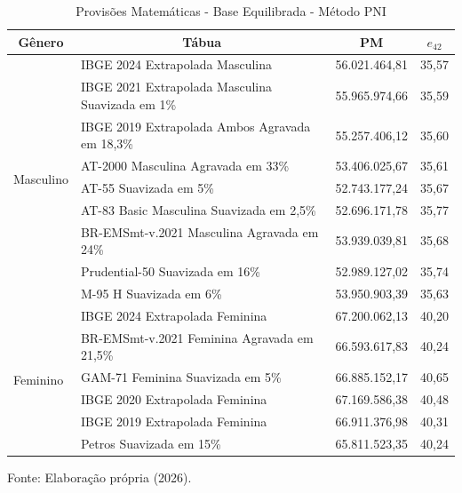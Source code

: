 \newpage
\begin{table}[htbp]
    \centering
    \caption{Provisões Matemáticas - Base Equilibrada - Método PNI}
    \begin{threeparttable}
    \renewcommand{\arraystretch}{1.0}
    \begin{tabular}{llrr}
    \toprule
    \multicolumn{1}{c}{\textbf{Gênero}} & \multicolumn{1}{c}{\textbf{Tábua}} & \multicolumn{1}{c}{\textbf{PM}} & \multicolumn{1}{c}{\textbf{$e_{42}$}} \\ \midrule
    \multirow{9}{*}{Masculino} & IBGE 2024 Extrapolada Masculina & 56.021.464,81 & 35,57 \\
                                & IBGE 2021 Extrapolada Masculina Suavizada em 1\% & 55.965.974,66 & 35,59 \\
                                & IBGE 2019 Extrapolada Ambos Agravada em 18,3\% & 55.257.406,12 & 35,60 \\
                                & AT-2000 Masculina Agravada em 33\% & 53.406.025,67	 & 35,61 \\
                                & AT-55 Suavizada em 5\% & 52.743.177,24 & 35,67 \\
                                & AT-83 Basic Masculina Suavizada em 2,5\% & 52.696.171,78 & 35,77 \\
                                & BR-EMSmt-v.2021 Masculina Agravada em 24\% & 53.939.039,81 & 35,68 \\
                                & Prudential-50 Suavizada em 16\% & 52.989.127,02 & 35,74 \\
                                & M-95 H Suavizada em 6\% & 53.950.903,39 & 35,63 \\ \hline
    \multirow{6}{*}{Feminino} & IBGE 2024 Extrapolada Feminina & 67.200.062,13 & 40,20 \\
                                & BR-EMSmt-v.2021 Feminina Agravada em 21,5\% & 66.593.617,83 & 40,24 \\
                                & GAM-71 Feminina Suavizada em 5\% & 66.885.152,17 & 40,65 \\
                                & IBGE 2020 Extrapolada Feminina & 67.169.586,38 & 40,48 \\
                                & IBGE 2019 Extrapolada Feminina & 66.911.376,98 & 40,31 \\ 
                                & Petros Suavizada em 15\% & 65.811.523,35 & 40,24 \\ \bottomrule
    \end{tabular}
    \begin{tablenotes}[flushleft]
        \small
        \item Fonte: Elaboração própria (2026).
    \end{tablenotes}
    \end{threeparttable}
    \label{tab:equilibrada-pni}
\end{table}

